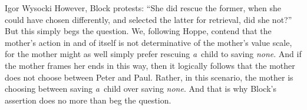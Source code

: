 \begin{artengenv}{Igor Wysocki}
However, Block 
\parencite*[][pp.50–51]{block_response_2022} %
 protests: ``She did rescue the former, when she could have chosen differently, and selected the latter for retrieval, did she not?'' But this simply begs the question. We, following Hoppe, contend that the mother's action in and of itself is not determinative of the mother's value scale, for the mother might as well simply prefer rescuing \textit{a}~child to saving \textit{none}. And if the mother frames her ends in this way, then it logically follows that the mother does not choose between Peter and Paul. Rather, in this scenario, the mother is choosing between saving \textit{a}~child over saving \textit{none}. And that is why Block's assertion does no more than beg the question.




\end{artengenv}
